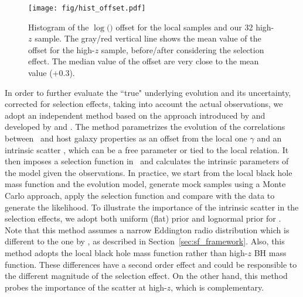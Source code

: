 \documentclass[apj]{emulateapj}
\begin{document}
\begin{figure}
\centering
{
\texttt{[image: fig/hist\_offset.pdf]}
}
\caption{\label{fig:offset_hist} 
Histogram of the $\log($\mbh$)$ offset for the local samples and our 32 high-$z$ sample. The gray/red vertical line shows the mean value of the offset for the high-$z$ sample, before/after considering the selection effect. The median value of the offset are very close to the mean value ($+0.3$).
}
\end{figure} 


In order to further evaluate the ``true" underlying evolution and its uncertainty, corrected for selection effects, taking into account the actual observations, we adopt an independent method based on the approach introduced by \citet{Tre++07} and developed by \citet{Park15} and \citet{Ding2017b}. The method parametrizes the evolution of the correlations between \mbh\ and host galaxy properties as an offset from the local one $\gamma$ and an intrinsic scatter \sint, which can be a free parameter or tied to the local relation. It then imposes a selection function in \mbh\ and calculates the intrinsic parameters of the model given the observations. In practice, we start from the local black hole mass function and the evolution model, generate mock samples using a Monte Carlo approach, apply the selection function and compare with the data to generate the likelihood. To illustrate the importance of the intrinsic scatter in the selection effects, we adopt both uniform (flat) prior and lognormal prior for \sint. 
Note that this method assumes a narrow Eddington radio distribution which is different to the one by \citet{Schulze2011}, as described in Section~\ref{sec:sf_framework}. Also, this method adopts the local black hole mass function rather than high-$z$ BH mass function. These differences have a second order effect and could be responsible to the different magnitude of the selection effect. On the other hand, this method probes the importance of the scatter at high-$z$, which is complementary. %
\end{document}
